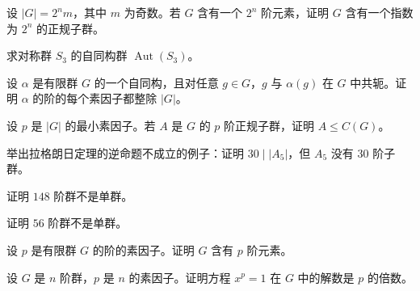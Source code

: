 \newpage
\noindent\begin{minipage}{\textwidth}
设 $|G|=2^n m$，其中 $m$ 为奇数。若 $G$ 含有一个 $2^n$ 阶元素，证明 $G$ 含有一个指数为 $2^n$ 的正规子群。
\end{minipage}\par\vfill
\noindent\begin{minipage}{\textwidth}
求对称群 $S_3$ 的自同构群 $\operatorname{Aut}(S_3)$。
\end{minipage}\par\vfill
\noindent\begin{minipage}{\textwidth}
设 $\alpha$ 是有限群 $G$ 的一个自同构，且对任意 $g\in G$，$g$ 与 $\alpha(g)$ 在 $G$ 中共轭。证明 $\alpha$ 的阶的每个素因子都整除 $|G|$。
\end{minipage}\par\vfill
\newpage
\noindent\begin{minipage}{\textwidth}
设 $p$ 是 $|G|$ 的最小素因子。若 $A$ 是 $G$ 的 $p$ 阶正规子群，证明 $A\le C(G)$。
\end{minipage}\par\vfill
\noindent\begin{minipage}{\textwidth}
举出拉格朗日定理的逆命题不成立的例子：证明 $30\mid |A_5|$，但 $A_5$ 没有 $30$ 阶子群。
\end{minipage}\par\vfill
\noindent\begin{minipage}{\textwidth}
证明 $148$ 阶群不是单群。
\end{minipage}\par\vfill
\newpage
\noindent\begin{minipage}{\textwidth}
证明 $56$ 阶群不是单群。
\end{minipage}\par\vfill
\noindent\begin{minipage}{\textwidth}
设 $p$ 是有限群 $G$ 的阶的素因子。证明 $G$ 含有 $p$ 阶元素。
\end{minipage}\par\vfill
\noindent\begin{minipage}{\textwidth}
设 $G$ 是 $n$ 阶群，$p$ 是 $n$ 的素因子。证明方程 $x^p=1$ 在 $G$ 中的解数是 $p$ 的倍数。
\end{minipage}\par\vfill
